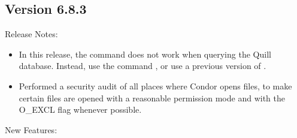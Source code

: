 \subsection*{\label{sec:New-6-8-3}Version 6.8.3}

\noindent Release Notes:

\begin{itemize}

\item In this release,
the command   does not work when querying
the Quill database.
Instead, use the command
  ,
or use a previous version of .

\item Performed a security audit of all places where Condor opens files,
to make certain files are opened with a reasonable permission mode
and with the
O\_EXCL flag whenever possible.

\end{itemize}


\noindent New Features:

